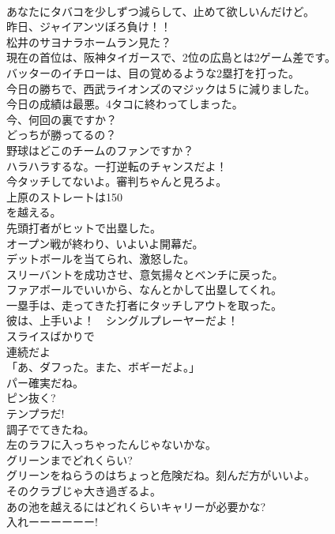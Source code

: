 \documentclass[8pt]{extreport}
\begin{document}
\begin{CJK}{UTF8}{min}
\\	あなたにタバコを少しずつ減らして、止めて欲しいんだけど。	
\\	昨日、ジャイアンツぼろ負け！！	
\\	松井のサヨナラホームラン見た？	
\\	現在の首位は、阪神タイガースで、2位の広島とは2ゲーム差です。	
\\	バッターのイチローは、目の覚めるような2塁打を打った。	
\\	今日の勝ちで、西武ライオンズのマジックは５に減りました。	
\\	今日の成績は最悪。4タコに終わってしまった。	
\\	今、何回の裏ですか？	
\\	どっちが勝ってるの？	
\\	野球はどこのチームのファンですか？	
\\	ハラハラするな。一打逆転のチャンスだよ！	
\\	今タッチしてないよ。審判ちゃんと見ろよ。	
\\	上原のストレートは150
\\	を越える。	
\\	先頭打者がヒットで出塁した。	
\\	オープン戦が終わり、いよいよ開幕だ。	
\\	デットボールを当てられ、激怒した。	
\\	スリーバントを成功させ、意気揚々とベンチに戻った。	
\\	ファアボールでいいから、なんとかして出塁してくれ。	
\\	一塁手は、走ってきた打者にタッチしアウトを取った。	
\\	彼は、上手いよ！　シングルプレーヤーだよ！	
\\	スライスばかりで
\\	連続だよ	
\\	「あ、ダフった。また、ボギーだよ。」	
\\	パー確実だね。	
\\	ピン抜く?	
\\	テンプラだ!	
\\	調子でてきたね。	
\\	左のラフに入っちゃったんじゃないかな。	
\\	グリーンまでどれくらい?	
\\	グリーンをねらうのはちょっと危険だね。刻んだ方がいいよ。	
\\	そのクラブじゃ大き過ぎるよ。	
\\	あの池を越えるにはどれくらいキャリーが必要かな?	
\\	入れーーーーーー!	

\end{CJK}
\end{document}

